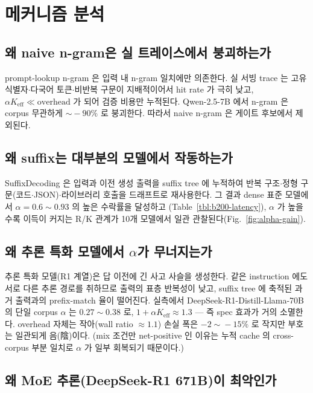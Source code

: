 
\section{메커니즘 분석}
\label{sec:mechanism}

\subsection{왜 naive n-gram은 실 트레이스에서 붕괴하는가}

prompt-lookup n-gram 은 입력 내 n-gram 일치에만 의존한다.
실 서빙 trace 는 고유 식별자$\cdot$다국어 토큰$\cdot$비반복 구문이 지배적이어서
hit rate 가 극히 낮고, $\alpha K_{\mathrm{eff}}\ll\mathrm{overhead}$ 가 되어
검증 비용만 누적된다. Qwen-2.5-7B 에서 n-gram 은 corpus 무관하게 $\sim\!-90\%$ 로 붕괴한다.
따라서 naive n-gram 은 게이트 후보에서 제외된다.

\subsection{왜 suffix는 대부분의 모델에서 작동하는가}

SuffixDecoding 은 입력과 이전 생성 출력을 suffix tree 에 누적하여
반복 구조$\cdot$정형 구문(코드$\cdot$JSON)$\cdot$라이브러리 호출을 드래프트로 재사용한다.
그 결과 dense 표준 모델에서 $\alpha=0.6\!\sim\!0.93$ 의 높은 수락률을 달성하고
(Table~\ref{tbl:b200-latency}), $\alpha$ 가 높을수록 이득이 커지는 R/K 관계가
10개 모델에서 일관 관찰된다(Fig.~\ref{fig:alpha-gain}).

\subsection{왜 추론 특화 모델에서 $\alpha$가 무너지는가}
\label{subsec:mech-reasoning}

추론 특화 모델(R1 계열)은 답 이전에 긴 사고 사슬을 생성한다.
같은 instruction 에도 서로 다른 추론 경로를 취하므로 출력의 표층 반복성이 낮고,
suffix tree 에 축적된 과거 출력과의 prefix-match 율이 떨어진다.
실측에서 DeepSeek-R1-Distill-Llama-70B 의 단일 corpus $\alpha$ 는 $0.27\!\sim\!0.38$ 로,
$1+\alpha K_{\mathrm{eff}}\approx 1.3$ --- 즉 spec 효과가 거의 소멸한다.
overhead 자체는 작아(wall ratio $\approx 1.1$) 손실 폭은 $-2\!\sim\!-15\%$ 로 작지만
부호는 일관되게 음(陰)이다.
(mix 조건만 net-positive 인 이유는 누적 cache 의 cross-corpus 부분 일치로
$\alpha$ 가 일부 회복되기 때문이다.)

\subsection{왜 MoE 추론(DeepSeek-R1 671B)이 최악인가}
\label{subsec:mech-moe}


